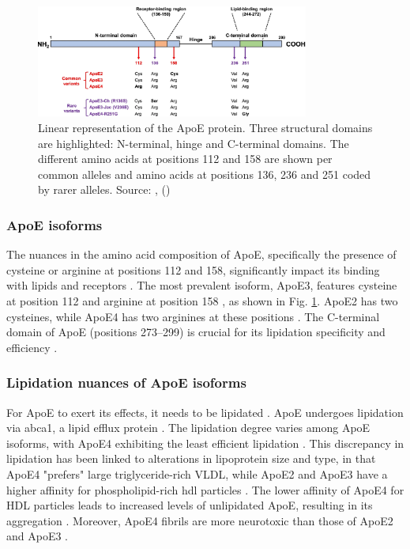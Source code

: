 \documentclass{amsart}
\begin{document}
\begin{figure}[htb]
  \includegraphics[width=0.8\textwidth]{figures/ApoEprot.png}
    \caption{Linear representation of the ApoE protein. Three structural domains are highlighted: N-terminal, hinge and C-terminal domains. The different amino acids at positions 112 and 158 are shown per common alleles and amino acids at positions 136, 236 and 251 coded by rarer alleles. Source: ,  (\citeyear{Bu2022APOEVariants}) \cite{Bu2022APOEVariants}}
  \label{fig2}
\end{figure}

\subsubsection*{ApoE isoforms}
The nuances in the amino acid composition of ApoE, specifically the presence of cysteine or arginine at positions 112 and 158, significantly impact its binding with lipids and receptors \cite{Yassine2020APOEDisease}. The most prevalent isoform, ApoE3, features cysteine at position 112 and arginine at position 158  \cite{Yassine2020APOEDisease}, as shown in Fig. \ref{fig2}. ApoE2 has two cysteines, while ApoE4 has two arginines at these positions \cite{Yassine2020APOEDisease}. The C-terminal domain of ApoE (positions 273–299) is crucial for its lipidation specificity and efficiency \cite{Hu2015OpposingMice}.

\subsubsection*{Lipidation nuances of ApoE isoforms}
For ApoE to exert its effects, it needs to be lipidated \cite{Husain2021APOETherapeutics}. ApoE undergoes lipidation via \acrfull{abca1}, a lipid efflux protein \cite{Flowers2020APOEBrain, Courtney2016LXRDisease}. The lipidation degree varies among ApoE isoforms, with ApoE4 exhibiting the least efficient lipidation \cite{Hu2015OpposingMice, Heinsinger2016ApolipoproteinFluid}. This discrepancy in lipidation has been linked to alterations in lipoprotein size and type, in that ApoE4 "prefers" large triglyceride-rich VLDL, while ApoE2 and ApoE3 have a higher affinity for phospholipid-rich \acrshort{hdl} particles \cite{Nguyen2010MolecularE4}. The lower affinity of ApoE4 for HDL particles leads to increased levels of unlipidated ApoE, resulting in its aggregation \cite{Hatters2006ApolipoproteinFunction}. Moreover, ApoE4 fibrils are more neurotoxic than those of ApoE2 and ApoE3 \cite{Hatters2006Amino-terminalFibrils}.
\end{document}
